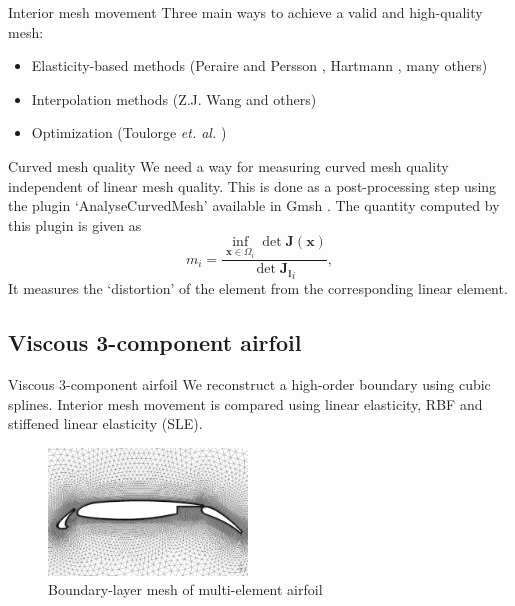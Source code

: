 \documentclass[t,12pt]{beamer}
\begin{document}
\begin{frame}{Interior mesh movement}
Three main ways to achieve a valid and high-quality mesh:
\begin{itemize}
\item Elasticity-based methods (Peraire and Persson \cite{curve:persson}, Hartmann \cite{curve:hartmann}, many others)
\item Interpolation methods (Z.J. Wang \cite{curve:meshcurve} and others)
\item Optimization (Toulorge \emph{et. al.} \cite{gmsh:untangling})
\end{itemize}
\end{frame}

\begin{frame}{Curved mesh quality}
We need a way for measuring curved mesh quality independent of linear mesh quality. This is done as a post-processing step using the plugin `AnalyseCurvedMesh' available in Gmsh . The quantity computed by this plugin is given as
\begin{equation} 
m_i = \frac{\inf_{\mathbf{x}\in\Omega_i}\det \mathbf{J}(\mathbf{x})}{\det \mathbf{J_l}_i},
\end{equation}
It measures the `distortion' of the element from the corresponding linear element.
\end{frame}

\subsection{Viscous 3-component airfoil}
\begin{frame}{Viscous 3-component airfoil}
We reconstruct a high-order boundary using cubic splines. Interior mesh movement is compared using linear elasticity, RBF and stiffened linear elasticity (SLE).
\begin{figure}
	\centering
	\includegraphics[width=150.0pt]{3compblack}
	\caption{Boundary-layer mesh of multi-element airfoil}
\end{figure}
\end{frame}
\end{document}
